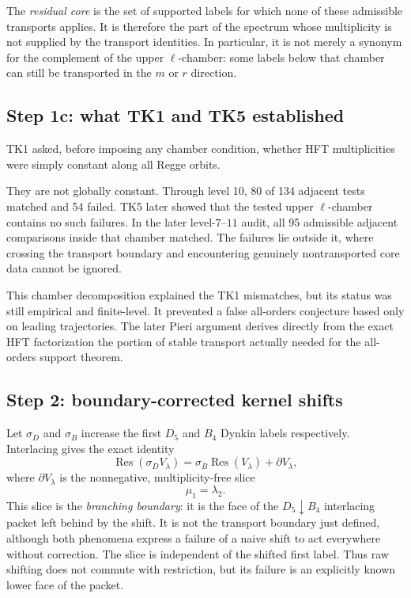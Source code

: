 \documentclass[11pt,a4paper]{article}
\theoremstyle{definition}
\newcommand{\Res}{\operatorname{Res}}
\begin{document}
The \emph{residual core} is the set of supported labels for which none of
these admissible transports applies.  It is therefore the part of the
spectrum whose multiplicity is not supplied by the transport identities.  In
particular, it is not merely a synonym for the complement of the upper
$\ell$-chamber: some labels below that chamber can still be transported in
the $m$ or $r$ direction.

\subsection{Step 1c: what TK1 and TK5 established}

TK1 asked, before imposing any chamber condition, whether HFT multiplicities
were simply constant along all Regge orbits.

They are not globally constant.  Through level 10, 80 of 134 adjacent tests
matched and 54 failed.  TK5 later showed that the tested upper $\ell$-chamber
contains no such failures.  In the later level-$7$--$11$ audit, all 95
admissible adjacent comparisons inside that chamber matched.  The failures
lie outside it, where crossing the transport boundary and encountering
genuinely nontransported core data cannot be ignored.

This chamber decomposition explained the TK1 mismatches, but its status was
still empirical and finite-level.  It prevented a false all-orders
conjecture based only on leading trajectories.  The later Pieri argument
derives directly from the exact HFT factorization the portion of stable
transport actually needed for the all-orders support theorem.

\subsection{Step 2: boundary-corrected kernel shifts}

Let $\sigma_D$ and $\sigma_B$ increase the first $D_5$ and $B_4$ Dynkin
labels respectively.  Interlacing gives the exact identity
\begin{equation}
\label{eq:branch-shift-defect}
   \Res(\sigma_DV_\lambda)
   =\sigma_B\Res(V_\lambda)+\partial V_\lambda,
\end{equation}
where $\partial V_\lambda$ is the nonnegative, multiplicity-free slice
\[
   \mu_1=\lambda_2.
\]
This slice is the \emph{branching boundary}: it is the face of the
$D_5\downarrow B_4$ interlacing packet left behind by the shift.  It is not
the transport boundary just defined, although both phenomena express a
failure of a naive shift to act everywhere without correction.  The slice is
independent of the shifted first label.  Thus raw shifting does not commute
with restriction, but its failure is an explicitly known lower face of the
packet.
\end{document}
